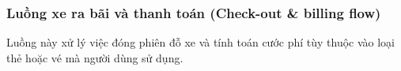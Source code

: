 \subsubsection{Luồng xe ra bãi và thanh toán (Check-out \& billing flow)}
Luồng này xử lý việc đóng phiên đỗ xe và tính toán cước phí tùy thuộc vào loại thẻ hoặc vé mà người dùng sử dụng.

